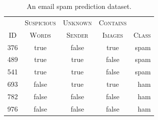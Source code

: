 \documentclass[xcolor={table}]{beamer}
\newcommand{\featN}[1]{\textsc{#1}}
\begin{document}
 \begin{frame} 
\begin{table}[!hbt]
\caption{An email spam prediction dataset.}
\label{table:spemDecTreeDataset}
\centering
\begin{footnotesize}
\begin{tabular}{ccccr}
\hline
	 & \featN{Suspicious}	& \featN{Unknown}	 & \featN{Contains}	 & \featN{} \\
\featN{ID}	 & \featN{Words}	& \featN{Sender}	 & \featN{Images}	 & \featN{Class} \\
\hline
376	 & true	 & false 	 & true	& spam \\
489	 & true	 & true 	 & false	& spam \\
541	 & true	 & true 	 & false	& spam \\
693	 & false	 & true 	 & true	& ham \\
782	 & false	 & false 	 & false	& ham \\
976	 & false	 & false 	 & false	& ham \\
\hline
\end{tabular}
\end{footnotesize}
\end{table}
\end{frame} 
\end{document}
